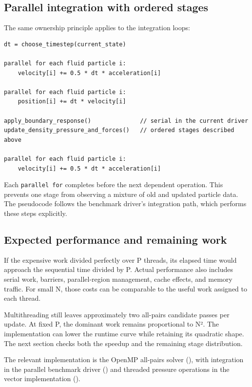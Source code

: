 \documentclass[
  11pt,
]{article}
\begin{document}
\subsection{Parallel integration with ordered
stages}\label{parallel-integration-with-ordered-stages}

The same ownership principle applies to the integration loops:

\begin{verbatim}
dt = choose_timestep(current_state)

parallel for each fluid particle i:
    velocity[i] += 0.5 * dt * acceleration[i]

parallel for each fluid particle i:
    position[i] += dt * velocity[i]

apply_boundary_response()              // serial in the current driver
update_density_pressure_and_forces()   // ordered stages described above

parallel for each fluid particle i:
    velocity[i] += 0.5 * dt * acceleration[i]
\end{verbatim}

Each \texttt{parallel\ for} completes before the next dependent
operation. This prevents one stage from observing a mixture of old and
updated particle data. The pseudocode follows the benchmark driver's
integration path, which performs these steps explicitly.

\subsection{Expected performance and remaining
work}\label{expected-performance-and-remaining-work}

If the expensive work divided perfectly over P threads, its elapsed time
would approach the sequential time divided by P. Actual performance also
includes serial work, barriers, parallel-region management, cache
effects, and memory traffic. For small N, those costs can be comparable
to the useful work assigned to each thread.

Multithreading still leaves approximately two all-pairs candidate passes
per update. At fixed P, the dominant work remains proportional to N².
The implementation can lower the runtime curve while retaining its
quadratic shape. The next section checks both the speedup and the
remaining stage distribution.

The relevant implementation is the OpenMP all-pairs solver
(), with integration in the
parallel benchmark driver () and
threaded pressure operations in the vector implementation
().
\end{document}
